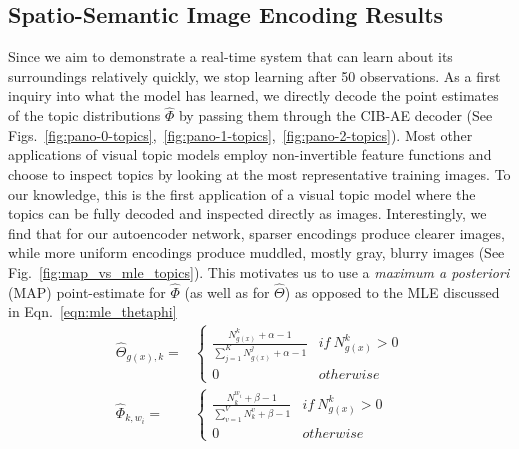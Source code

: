 \subsection{Spatio-Semantic Image Encoding Results} \label{sec:spatial-prediction-results}
Since we aim to demonstrate a real-time system that can learn about its surroundings relatively quickly, we stop learning after 50 observations. As a first inquiry into what the model has learned, we directly decode the point estimates of the topic distributions $\hat{\Phi}$ by passing them through the CIB-AE decoder (See Figs.~\ref{fig:pano-0-topics},~\ref{fig:pano-1-topics},~\ref{fig:pano-2-topics}). Most other applications of visual topic models employ non-invertible feature functions and choose to inspect topics by looking at the most representative training images. To our knowledge, this is the first application of a visual topic model where the topics can be fully decoded and inspected directly as images. Interestingly, we find that for our autoencoder network, sparser encodings produce clearer images, while more uniform encodings produce muddled, mostly gray, blurry images (See Fig.~\ref{fig:map_vs_mle_topics}). This motivates us to use a \emph{maximum a posteriori} (MAP) point-estimate for $\hat{\Phi}$ (as well as for $\hat{\Theta}$) as opposed to the MLE discussed in Eqn.~\ref{eqn:mle_thetaphi}
\begin{equation} \label{eqn:map_thetaphi}
\begin{split}
\hat{\Theta}_{g(x), k} =&
    \begin{cases}
        \frac{N^k_{g(x)} + \alpha - 1}{\sum_{j=1}^K N^j_{g(x)} + \alpha - 1} & if~N^k_{g(x)} > 0 \\
        0 & otherwise
    \end{cases} \\
\hat{\Phi}_{k, w_i} =&
    \begin{cases}
        \frac{N^{w_i}_k + \beta - 1}{\sum_{v=1}^V N^v_k + \beta - 1} & if~N^k_{g(x)} > 0 \\
        0 & otherwise
    \end{cases}
\end{split}
\end{equation}


